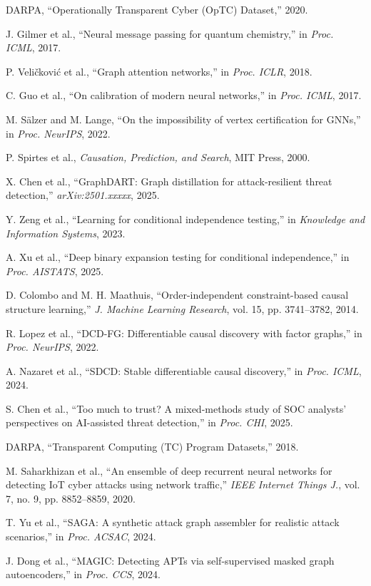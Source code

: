 \documentclass[conference]{IEEEtran}
\begin{document}
\begin{thebibliography}{99}
DARPA, ``Operationally Transparent Cyber (OpTC) Dataset,'' 2020.

J. Gilmer et al., ``Neural message passing for quantum chemistry,'' in \emph{Proc. ICML}, 2017.

P. Veličković et al., ``Graph attention networks,'' in \emph{Proc. ICLR}, 2018.

C. Guo et al., ``On calibration of modern neural networks,'' in \emph{Proc. ICML}, 2017.

M. Sälzer and M. Lange, ``On the impossibility of vertex certification for GNNs,'' in \emph{Proc. NeurIPS}, 2022.

P. Spirtes et al., \emph{Causation, Prediction, and Search}, MIT Press, 2000.

X. Chen et al., ``GraphDART: Graph distillation for attack-resilient threat detection,'' \emph{arXiv:2501.xxxxx}, 2025.

Y. Zeng et al., ``Learning for conditional independence testing,'' in \emph{Knowledge and Information Systems}, 2023.

A. Xu et al., ``Deep binary expansion testing for conditional independence,'' in \emph{Proc. AISTATS}, 2025.

D. Colombo and M. H. Maathuis, ``Order-independent constraint-based causal structure learning,'' \emph{J. Machine Learning Research}, vol. 15, pp. 3741--3782, 2014.

R. Lopez et al., ``DCD-FG: Differentiable causal discovery with factor graphs,'' in \emph{Proc. NeurIPS}, 2022.

A. Nazaret et al., ``SDCD: Stable differentiable causal discovery,'' in \emph{Proc. ICML}, 2024.

S. Chen et al., ``Too much to trust? A mixed-methods study of SOC analysts' perspectives on AI-assisted threat detection,'' in \emph{Proc. CHI}, 2025.

DARPA, ``Transparent Computing (TC) Program Datasets,'' 2018.

M. Saharkhizan et al., ``An ensemble of deep recurrent neural networks for detecting IoT cyber attacks using network traffic,'' \emph{IEEE Internet Things J.}, vol. 7, no. 9, pp. 8852--8859, 2020.

T. Yu et al., ``SAGA: A synthetic attack graph assembler for realistic attack scenarios,'' in \emph{Proc. ACSAC}, 2024.

J. Dong et al., ``MAGIC: Detecting APTs via self-supervised masked graph autoencoders,'' in \emph{Proc. CCS}, 2024.

\end{thebibliography}
\end{document}
